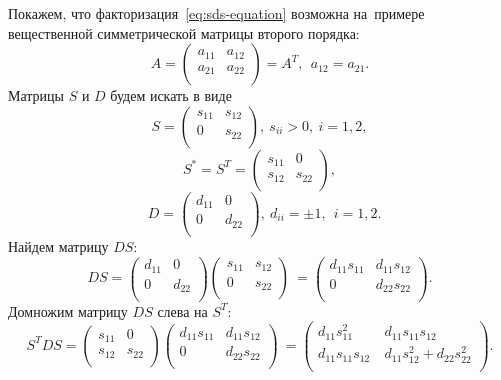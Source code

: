 \documentclass[11pt,a4paper,twoside]{report}
\numberwithin{equation}{section}
\theoremstyle{definition}
\theoremstyle{plain}
\begin{document}
Покажем, что факторизация~\eqref{eq:sds-equation} возможна на~примере
вещественной симметрической матрицы второго порядка:
%
$$
    A =
    \begin{pmatrix}
        a_{11} & a_{12} \\
        a_{21} & a_{22} \\
    \end{pmatrix}
    = A^{T}, ~~a_{12} = a_{21}.
$$
%
Матрицы $S$ и $D$ будем искать в виде
$$
    S =
    \begin{pmatrix}
        s_{11} & s_{12} \\
        0      & s_{22} \\
    \end{pmatrix}
    ,~s_{ii} > 0,~i = 1,2,
$$
%
%
$$
    S^* = S^T =
    \begin{pmatrix}
        s_{11} & 0      \\
        s_{12} & s_{22} \\
    \end{pmatrix}
    ,
$$
%
%
$$
    ~~~D =
    \begin{pmatrix}
        d_{11} & 0      \\
        0      & d_{22} \\
    \end{pmatrix}
    , ~d_{ii} = \pm 1, ~~i = 1,2.
$$
%
Найдем матрицу $DS$:
%
$$
    DS =
    \begin{pmatrix}
        d_{11} & 0      \\
        0      & d_{22} \\
    \end{pmatrix}
    \begin{pmatrix}
        s_{11} & s_{12} \\
        0      & s_{22} \\
    \end{pmatrix}
    ~=
    \begin{pmatrix}
        d_{11}s_{11} & d_{11}s_{12} \\
        0            & d_{22}s_{22} \\
    \end{pmatrix}
    .
$$
%
Домножим матрицу $DS$ слева на $S^T$:
%
$$
    S^{T}DS =
    \begin{pmatrix}
        s_{11} & 0      \\
        s_{12} & s_{22} \\
    \end{pmatrix}
    \begin{pmatrix}
        d_{11}s_{11} & d_{11}s_{12} \\
        0            & d_{22}s_{22} \\
    \end{pmatrix}
    ~=
    \begin{pmatrix}
        d_{11}s_{11}^2   & ~d_{11}s_{11}s_{12}                  \\
        d_{11}s_{11}s_{12} & ~d_{11}s_{12}^2 + d_{22}s_{22}^2 \\
    \end{pmatrix}
    .
$$
\end{document}

